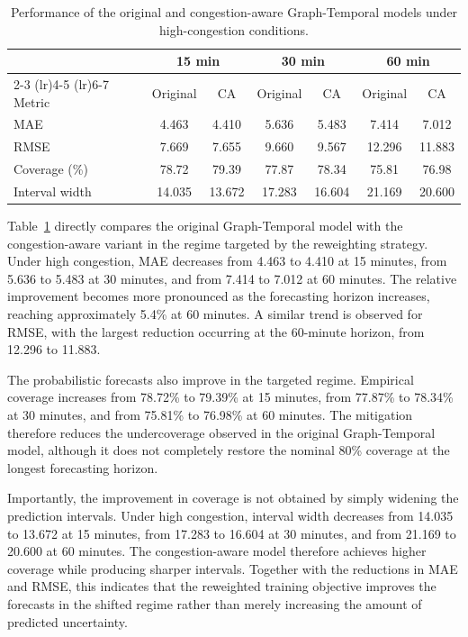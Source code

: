 \begin{table}[H]
\centering
\caption{Performance of the original and congestion-aware Graph-Temporal
models under high-congestion conditions.}
\label{tab:congestion_aware_results}
\begin{tabular}{lcccccc}
\toprule
& \multicolumn{2}{c}{15 min}
& \multicolumn{2}{c}{30 min}
& \multicolumn{2}{c}{60 min} \\
\cmidrule(lr){2-3}
\cmidrule(lr){4-5}
\cmidrule(lr){6-7}
Metric & Original & CA & Original & CA & Original & CA \\
\midrule
MAE
& 4.463 & 4.410
& 5.636 & 5.483
& 7.414 & 7.012 \\

RMSE
& 7.669 & 7.655
& 9.660 & 9.567
& 12.296 & 11.883 \\

Coverage (\%)
& 78.72 & 79.39
& 77.87 & 78.34
& 75.81 & 76.98 \\

Interval width
& 14.035 & 13.672
& 17.283 & 16.604
& 21.169 & 20.600 \\
\bottomrule
\end{tabular}
\end{table}

Table~\ref{tab:congestion_aware_results} directly compares the original
Graph-Temporal model with the congestion-aware variant in the regime targeted
by the reweighting strategy. Under high congestion, MAE decreases from
4.463 to 4.410 at 15 minutes, from 5.636 to 5.483 at 30 minutes, and from
7.414 to 7.012 at 60 minutes. The relative improvement becomes more
pronounced as the forecasting horizon increases, reaching approximately
5.4\% at 60 minutes. A similar trend is observed for RMSE, with the largest
reduction occurring at the 60-minute horizon, from 12.296 to 11.883.

The probabilistic forecasts also improve in the targeted regime. Empirical
coverage increases from 78.72\% to 79.39\% at 15 minutes, from 77.87\% to
78.34\% at 30 minutes, and from 75.81\% to 76.98\% at 60 minutes. The
mitigation therefore reduces the undercoverage observed in the original
Graph-Temporal model, although it does not completely restore the nominal
80\% coverage at the longest forecasting horizon.

Importantly, the improvement in coverage is not obtained by simply widening
the prediction intervals. Under high congestion, interval width decreases
from 14.035 to 13.672 at 15 minutes, from 17.283 to 16.604 at 30 minutes,
and from 21.169 to 20.600 at 60 minutes. The congestion-aware model therefore
achieves higher coverage while producing sharper intervals. Together with the
reductions in MAE and RMSE, this indicates that the reweighted training
objective improves the forecasts in the shifted regime rather than merely
increasing the amount of predicted uncertainty.


